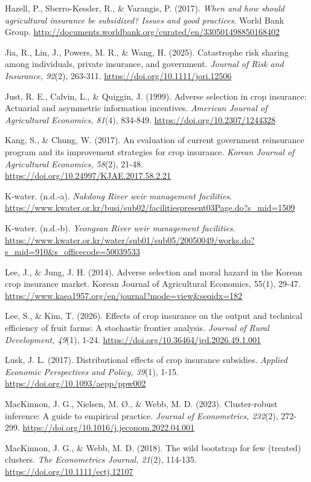 \begin{wordreferences}
Hazell, P., Sberro-Kessler, R., \& Varangis, P. (2017). \emph{When and how should agricultural insurance be subsidized? Issues and good practices}. World Bank Group. \url{http://documents.worldbank.org/curated/en/330501498850168402}

Jia, R., Lin, J., Powers, M. R., \& Wang, H. (2025). Catastrophe risk sharing among individuals, private insurance, and government. \emph{Journal of Risk and Insurance, 92}(2), 263-311. \url{https://doi.org/10.1111/jori.12506}

Just, R. E., Calvin, L., \& Quiggin, J. (1999). Adverse selection in crop insurance: Actuarial and asymmetric information incentives. \emph{American Journal of Agricultural Economics, 81}(4), 834-849. \url{https://doi.org/10.2307/1244328}

Kang, S., \& Chung, W. (2017). An evaluation of current government reinsurance program and its improvement strategies for crop insurance. \emph{Korean Journal of Agricultural Economics, 58}(2), 21-48. \url{https://doi.org/10.24997/KJAE.2017.58.2.21}

K-water. (n.d.-a). \emph{Nakdong River weir management facilities}. \url{https://www.kwater.or.kr/busi/sub02/facilitiespresent03Page.do?s_mid=1509}

K-water. (n.d.-b). \emph{Yeongsan River weir management facilities}. \url{https://www.kwater.or.kr/water/sub01/sub05/20050049/works.do?s_mid=910&s_officecode=50039533}

Lee, J., \& Jung, J. H. (2014). Adverse selection and moral hazard in the Korean crop insurance market. Korean Journal of Agricultural Economics, 55(1), 29-47. \url{https://www.kaea1957.org/en/journal?mode=view&seqidx=182}

Lee, S., \& Kim, T. (2026). Effects of crop insurance on the output and technical efficiency of fruit farms: A stochastic frontier analysis. \emph{Journal of Rural Development, 49}(1), 1-24. \url{https://doi.org/10.36464/jrd.2026.49.1.001}

Lusk, J. L. (2017). Distributional effects of crop insurance subsidies. \emph{Applied Economic Perspectives and Policy, 39}(1), 1-15. \url{https://doi.org/10.1093/aepp/ppw002}

MacKinnon, J. G., Nielsen, M. Ø., \& Webb, M. D. (2023). Cluster-robust inference: A guide to empirical practice. \emph{Journal of Econometrics, 232}(2), 272-299. \url{https://doi.org/10.1016/j.jeconom.2022.04.001}

MacKinnon, J. G., \& Webb, M. D. (2018). The wild bootstrap for few (treated) clusters. \emph{The Econometrics Journal, 21}(2), 114-135. \url{https://doi.org/10.1111/ectj.12107}


\end{wordreferences}
